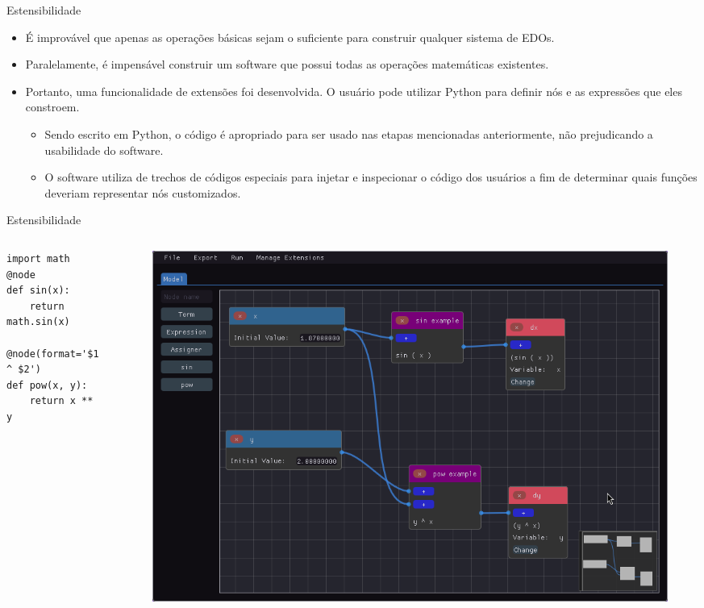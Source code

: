 \begin{frame}[fragile]{Estensibilidade}
    \begin{itemize}
        \item É improvável que apenas as operações básicas sejam o suficiente para construir qualquer sistema de EDOs.
        \item Paralelamente, é impensável construir um software que possui todas as operações matemáticas existentes.
        \item Portanto, uma funcionalidade de extensões foi desenvolvida. O usuário pode utilizar Python para definir nós e as expressões que eles constroem.
        \begin{itemize}
            \item Sendo escrito em Python, o código é apropriado para ser usado nas etapas mencionadas anteriormente, não prejudicando a usabilidade do software.
            \item O software utiliza de trechos de códigos especiais para injetar e inspecionar o código dos usuários a fim de determinar quais funções deveriam representar nós customizados.
        \end{itemize}
    \end{itemize}
\end{frame}

\begin{frame}[fragile]{Estensibilidade}
    \begin{columns}
        \begin{column}{.3\textwidth}
            \begin{verbatim}
import math
@node
def sin(x):
    return math.sin(x)

@node(format='$1 ^ $2')
def pow(x, y):
    return x ** y
            \end{verbatim}
        \end{column}
        \begin{column}{.7\textwidth}
            \begin{figure}
                \centering
                \includegraphics[width=\textwidth]{contents/imgs/ode-designer/ext-sin-pow.png}
            \end{figure}
        \end{column}
    \end{columns}
\end{frame}

